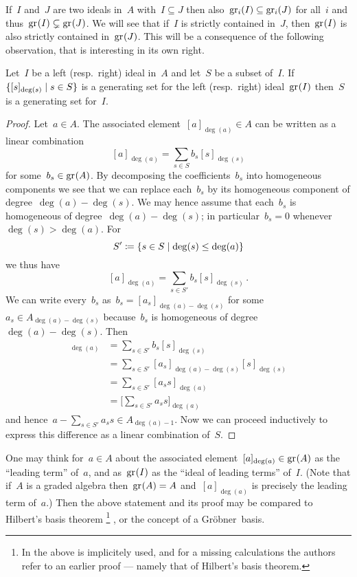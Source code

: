 If~$I$ and~$J$ are two ideals in~$A$ with~$I \subseteq J$ then also~$\gr[i](I) \subseteq \gr[i](J)$ for all~$i$ and thus~$\gr(I) \subsetneq \gr(J)$.
We will see that if~$I$ is strictly contained in~$J$, then~$\gr(I)$ is also strictly contained in~$\gr(J)$.
This will be a consequence of the following observation, that is interesting in its own right.

\begin{proposition}
  \label{pulled back generating set}
  Let~$I$ be a left (resp.\ right) ideal in~$A$ and let~$S$ be a subset of~$I$.
  If~$\{ [s]_{\deg(s)} \suchthat s \in S\}$ is a generating set for the left (resp.\ right) ideal~$\gr(I)$ then~$S$ is a generating set for~$I$.
\end{proposition}

\begin{proof}
  Let~$a \in A$.
  The associated element~$[a]_{\deg(a)} \in A$ can be written as a linear combination
  \[
    [a]_{\deg(a)}
    =
    \sum_{s \in S} b_s [s]_{\deg(s)}
  \]
  for some~$b_s \in \gr(A)$.
  By decomposing the coefficients~$b_s$ into homogeneous components we see that we can replace each~$b_s$ by its homogeneous component of degree~$\deg(a) - \deg(s)$.
  We may hence assume that each~$b_s$ is homogeneous of degree~$\deg(a) - \deg(s)$;
  in particular~$b_s = 0$ whenever~$\deg(s) > \deg(a)$.
  For
  \[
    S'
    \defined
    \{
      s \in S
    \suchthat
      \deg(s) \leq \deg(a)
    \}
  \]
  we thus have
  \[
    [a]_{\deg(a)}
    =
    \sum_{s \in S'} b_s [s]_{\deg(s)} \,.
  \]
  We can write every~$b_s$ as~$b_s = [a_s]_{\deg(a) - \deg(s)}$ for some~$a_s \in A_{\deg(a) - \deg(s)}$ because~$b_s$ is homogeneous of degree~$\deg(a)-\deg(s)$.
  Then
  \begin{align*}
    [a]_{\deg(a)}
    &=
    \sum_{s \in S'} b_s [s]_{\deg(s)}
    \\
    &=
    \sum_{s \in S'} [a_s]_{\deg(a) - \deg(s)} [s]_{\deg(s)}
    \\
    &=
    \sum_{s \in S'} [a_s s]_{\deg(a)}
    \\
    &=
    \Biggl[ \sum_{s \in S'} a_s s \Biggr]_{\deg(a)}
  \end{align*}
  and hence~$a - \sum_{s \in S'} a_s s \in A_{\deg(a) - 1}$.
  Now we can proceed inductively to express this difference as a linear combination of~$S$.
\end{proof}

\begin{remark}
  One may think for~$a \in A$ about the associated element~$[a]_{\deg(a)} \in \gr(A)$ as the \enquote{leading term} of~$a$, and as~$\gr(I)$ as the \enquote{ideal of leading terms} of~$I$.
  (Note that if~$A$ is a graded algebra then~$\gr(A) = A$ and~$[a]_{\deg(a)}$ is precisely the leading term of~$a$.)
  Then the above statement and its proof may be compared to Hilbert’s basis theorem%
  \footnote{In \cite[Proposition~6.7]{noncommutative_noetherian} the above  is implicitely used, and for a missing calculations the authors refer to an earlier proof --- namely that of Hilbert’s basis theorem.}%
  , or the concept of a Gröbner~basis.
\end{remark}

